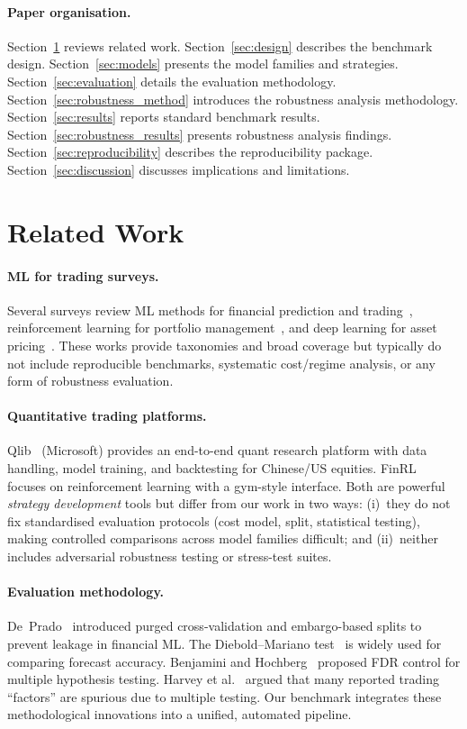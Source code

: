 \documentclass[preprint,review,12pt]{elsarticle}
\begin{document}
\paragraph{Paper organisation.}
Section~\ref{sec:related} reviews related work.
Section~\ref{sec:design} describes the benchmark design.
Section~\ref{sec:models} presents the model families and strategies.
Section~\ref{sec:evaluation} details the evaluation methodology.
Section~\ref{sec:robustness_method} introduces the robustness analysis methodology.
Section~\ref{sec:results} reports standard benchmark results.
Section~\ref{sec:robustness_results} presents robustness analysis findings.
Section~\ref{sec:reproducibility} describes the reproducibility package.
Section~\ref{sec:discussion} discusses implications and limitations.


\section{Related Work}
\label{sec:related}

\paragraph{ML for trading surveys.}
Several surveys review ML methods for financial prediction and trading~\citep{ref14,ref16}, reinforcement learning for portfolio management~\citep{ref7,ref10}, and deep learning for asset pricing~\citep{ref15}.
These works provide taxonomies and broad coverage but typically do not include reproducible benchmarks, systematic cost/regime analysis, or any form of robustness evaluation.

\paragraph{Quantitative trading platforms.}
Qlib~\citep{ref11} (Microsoft) provides an end-to-end quant research platform with data handling, model training, and backtesting for Chinese/US equities.
FinRL~\citep{ref81} focuses on reinforcement learning with a gym-style interface.
Both are powerful \emph{strategy development} tools but differ from our work in two ways: (i)~they do not fix standardised evaluation protocols (cost model, split, statistical testing), making controlled comparisons across model families difficult; and (ii)~neither includes adversarial robustness testing or stress-test suites.

\paragraph{Evaluation methodology.}
De~Prado~\citep{ref42,ref5} introduced purged cross-validation and embargo-based splits to prevent leakage in financial ML.
The Diebold--Mariano test~\citep{ref_dm} is widely used for comparing forecast accuracy.
Benjamini and Hochberg~\citep{ref_bh} proposed FDR control for multiple hypothesis testing.
Harvey et al.~\citep{ref_harvey} argued that many reported trading ``factors'' are spurious due to multiple testing.
Our benchmark integrates these methodological innovations into a unified, automated pipeline.
\end{document}
